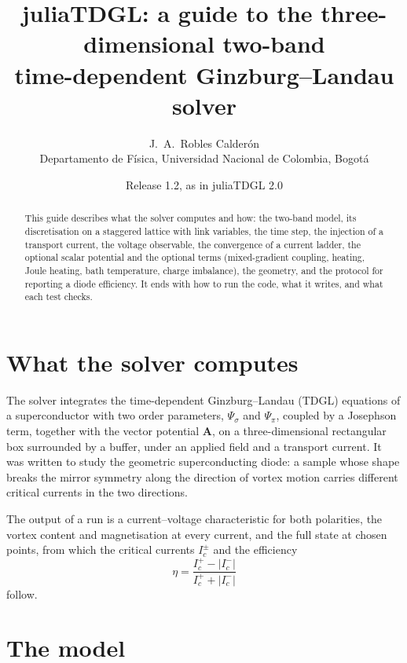 \documentclass[11pt,a4paper]{article}
\title{juliaTDGL: a guide to the three-dimensional two-band\\
time-dependent Ginzburg--Landau solver}
\author{J.~A.~Robles Calder\'on\\
\small Departamento de F\'isica, Universidad Nacional de Colombia, Bogot\'a}
\date{Release 1.2, as in juliaTDGL 2.0}
\begin{document}
\sloppy
\maketitle

\begin{abstract}
\noindent
This guide describes what the solver computes and how: the two-band
model, its discretisation on a staggered lattice with link variables, the
time step, the injection of a transport current, the voltage observable,
the convergence of a current ladder, the optional scalar potential and the
optional terms (mixed-gradient coupling, heating, Joule heating, bath
temperature, charge imbalance), the geometry, and the protocol for
reporting a diode efficiency. It ends with how to run the code, what it
writes, and what each test checks.
\end{abstract}

\tableofcontents

\section{What the solver computes}

The solver integrates the time-dependent Ginzburg--Landau (TDGL) equations
of a superconductor with two order parameters, $\Psi_\sigma$ and $\Psi_\pi$,
coupled by a Josephson term, together with the vector potential
$\mathbf A$, on a three-dimensional rectangular box surrounded by a buffer,
under an applied field and a transport current. It was written to study
the geometric superconducting diode: a sample whose shape breaks the
mirror symmetry along the direction of vortex motion carries different
critical currents in the two directions.

The output of a run is a current--voltage characteristic for both
polarities, the vortex content and magnetisation at every current, and the
full state at chosen points, from which the critical currents
$I_c^\pm$ and the efficiency
\begin{equation}
  \eta = \frac{I_c^{+}-|I_c^{-}|}{I_c^{+}+|I_c^{-}|}
\end{equation}
follow.

\section{The model}
\label{sec:model}
\end{document}
